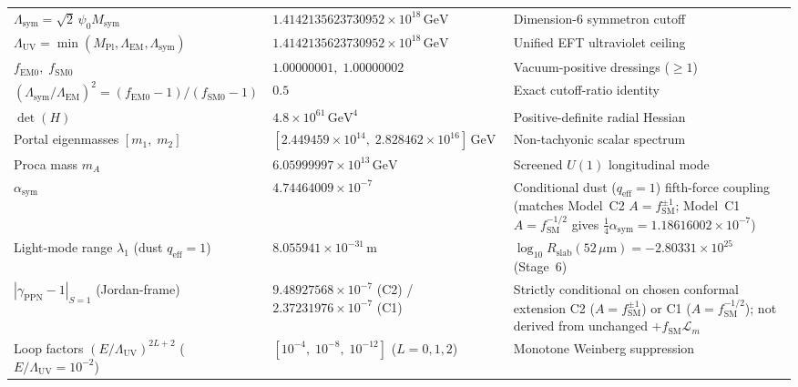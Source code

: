 \begin{table}[htbp]
\begin{tabular}{|>{\raggedright\arraybackslash}p{5.5cm}|>{\raggedright\arraybackslash}p{4.3cm}|>{\raggedright\arraybackslash}p{5.0cm}|}
$\Lambda_{\mathrm{sym}} = \sqrt{2}\,\psi_0 M_{\mathrm{sym}}$ & $1.4142135623730952 \times 10^{18}\,\mathrm{GeV}$ & Dimension-6 symmetron cutoff \\
$\Lambda_{\mathrm{UV}} = \min(M_{\mathrm{Pl}},\Lambda_{\mathrm{EM}},\Lambda_{\mathrm{sym}})$ & $1.4142135623730952 \times 10^{18}\,\mathrm{GeV}$ & Unified EFT ultraviolet ceiling \\
$f_{\mathrm{EM}0},\;f_{\mathrm{SM}0}$ & $1.00000001,\;1.00000002$ & Vacuum-positive dressings ($\ge 1$) \\
$(\Lambda_{\mathrm{sym}}/\Lambda_{\mathrm{EM}})^2 = (f_{\mathrm{EM}0}-1)/(f_{\mathrm{SM}0}-1)$ & $0.5$ & Exact cutoff-ratio identity \\
$\det(H)$ & $4.8 \times 10^{61}\,\mathrm{GeV}^4$ & Positive-definite radial Hessian \\
Portal eigenmasses $[m_1,\;m_2]$ & $[2.449459\times 10^{14},\;2.828462\times 10^{16}]\,\mathrm{GeV}$ & Non-tachyonic scalar spectrum \\
Proca mass $m_A$ & $6.05999997 \times 10^{13}\,\mathrm{GeV}$ & Screened $U(1)$ longitudinal mode \\
$\alpha_{\mathrm{sym}}$ & $4.74464009 \times 10^{-7}$ & Conditional dust ($q_{\mathrm{eff}}=1$) fifth-force coupling (matches Model~C2 $A=f_{\mathrm{SM}}^{\pm 1}$; Model~C1 $A=f_{\mathrm{SM}}^{-1/2}$ gives $\frac{1}{4}\alpha_{\mathrm{sym}} = 1.18616002\times 10^{-7}$) \\
Light-mode range $\lambda_1$ (dust $q_{\mathrm{eff}}=1$) & $8.055941 \times 10^{-31}\,\mathrm{m}$ & $\log_{10} R_{\mathrm{slab}}(52\,\mu\mathrm{m}) = -2.80331\times 10^{25}$ (Stage~6) \\
$|\gamma_{\mathrm{PPN}} - 1|_{S=1}$ (Jordan-frame) & $9.48927568 \times 10^{-7}$ (C2) / $2.37231976 \times 10^{-7}$ (C1) & Strictly conditional on chosen conformal extension C2 ($A=f_{\mathrm{SM}}^{\pm 1}$) or C1 ($A=f_{\mathrm{SM}}^{-1/2}$); not derived from unchanged $+f_{\mathrm{SM}}\mathcal{L}_m$ \\
Loop factors $(E/\Lambda_{\mathrm{UV}})^{2L+2}$ ($E/\Lambda_{\mathrm{UV}}=10^{-2}$) & $[10^{-4},\;10^{-8},\;10^{-12}]$ ($L=0,1,2$) & Monotone Weinberg suppression \\
\hline
\end{tabular}
\end{table}

